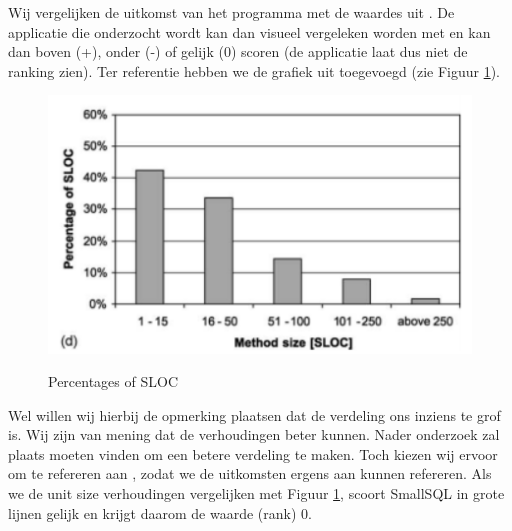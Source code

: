 \documentclass[a4paper]{article}
\begin{document}
Wij vergelijken de uitkomst van het programma met de waardes uit \cite{B}. De applicatie die onderzocht wordt kan dan visueel vergeleken worden met \cite{B} en kan dan boven (+), onder (-) of gelijk (0) scoren (de applicatie laat dus niet de ranking zien). Ter referentie hebben we de grafiek uit \cite{B} toegevoegd (zie Figuur \ref{fig:RefVerdeling}).
\begin{figure}[htbp]
\caption{Percentages of SLOC}
\centering
\includegraphics[width=0.6 \textwidth]{Capture.png}
\label{fig:RefVerdeling}
\end{figure}

Wel willen wij hierbij de opmerking plaatsen dat de verdeling ons inziens te grof is. Wij zijn van mening dat de verhoudingen beter kunnen. Nader onderzoek zal plaats moeten vinden om een betere verdeling te maken. Toch kiezen wij ervoor om te refereren aan \cite{B}, zodat we de uitkomsten ergens aan kunnen refereren. Als we de unit size verhoudingen vergelijken met Figuur \ref{fig:RefVerdeling}, scoort SmallSQL in grote lijnen gelijk en krijgt daarom de waarde (rank) 0.
\end{document}
